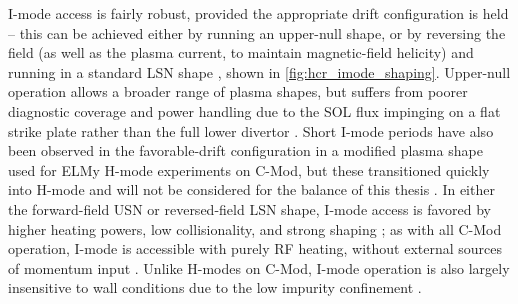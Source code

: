 \begin{figure}[t]
 \pushtooutside
\end{figure}

I-mode access is fairly robust, provided the appropriate drift configuration is held -- this can be achieved either by running an upper-null shape, or by reversing the field (as well as the plasma current, to maintain magnetic-field helicity) and running in a standard LSN shape \cite{Hubbard2012}, shown in \cref{fig:hcr_imode_shaping}.  Upper-null operation allows a broader range of plasma shapes, but suffers from poorer diagnostic coverage and power handling due to the SOL flux impinging on a flat strike plate rather than the full lower divertor \cite{Hubbard2012,Dominguez2012}.  Short I-mode periods have also been observed in the favorable-drift configuration in a modified plasma shape used for ELMy H-mode experiments on C-Mod, but these transitioned quickly into H-mode and will not be considered for the balance of this thesis \cite{Dominguez2012,Hughes2013}.  In either the forward-field USN or reversed-field LSN shape, I-mode access is favored by higher heating powers, low collisionality, and strong shaping \cite{Whyte2010}; as with all C-Mod operation, I-mode is accessible with purely RF heating, without external sources of momentum input \cite{Hubbard2012b}.  Unlike H-modes on C-Mod, I-mode operation is also largely insensitive to wall conditions due to the low impurity confinement \cite{Hubbard2012}.

